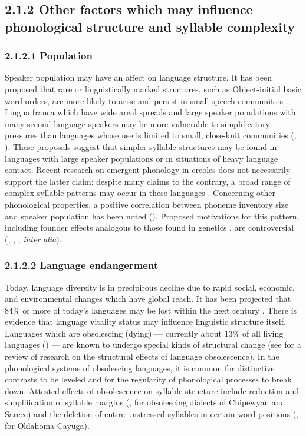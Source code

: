 \subsection{2.1.2 Other factors which may influence phonological structure and syllable complexity}
\subsubsection{\textbf{2.1.2.1} \textbf{Population}}

  Speaker population may have an affect on language structure. It has been proposed that rare or linguistically marked structures, such as Object-initial basic word orders, are more likely to arise and persist in small speech communities \citep{Nettle1999a}. Lingua franca which have wide areal spreads and large speaker populations with many second-language speakers may be more vulnerable to simplificatory pressures than languages whose use is limited to small, close-knit communities (\citealt{Nettle1999b}, \citealt{LupyanDale2010}). These proposals suggest that simpler syllable structures may be found in languages with large speaker populations or in situations of heavy language contact. Recent research on emergent phonology in creoles does not necessarily support the latter claim: despite many claims to the contrary, a broad range of complex syllable patterns may occur in these languages \citep{Schramm2014}. Concerning other phonological properties, a positive correlation between phoneme inventory size and speaker population has been noted (\citealt{HayBauer2007}). Proposed motivations for this pattern, including founder effects analogous to those found in genetics \citep{Atkinson2011}, are controversial (\citealt{Bybee2011}, \citealt{MaddiesonEtAl2011}, \citealt{HunleyEtAl2012}, \textit{inter} \textit{alia}).

\subsubsection{\textbf{2.1.2.2} \textbf{Language} \textbf{endangerment}}

  Today, language diversity is in precipitous decline due to rapid social, economic, and environmental changes which have global reach. It has been projected that 84\% or more of today’s languages may be lost within the next century \citep[113-114]{Nettle1999b}. There is evidence that language vitality status may influence linguistic structure itself. Languages which are obsolescing (dying) — currently about 13\% of all living languages (\citealt{SimonsFennig2018}) — are known to undergo special kinds of structural change (see \citealt{Romaine2010} for a review of research on the structural effects of language obsolescence). In the phonological systems of obsolescing languages, it is common for distinctive contrasts to be leveled and for the regularity of phonological processes to break down. Attested effects of obsolescence on syllable structure include reduction and simplification of syllable margins (\citealt{Cook1989}, for obsolescing dialects of Chipewyan and Sarcee) and the deletion of entire unstressed syllables in certain word positions (\citealt{Mithun1989}, for Oklahoma Cayuga).


